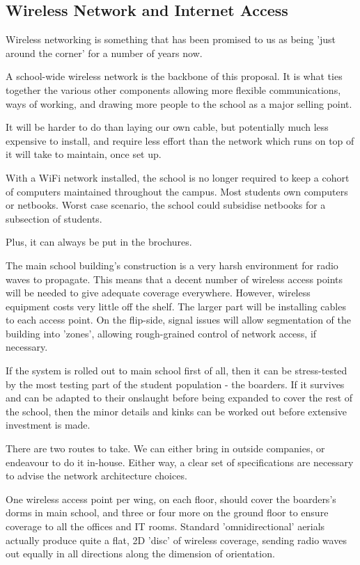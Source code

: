 \documentclass[a4paper,leqno,titlepage]{article}
\begin{document}
\subsection{Wireless Network and Internet Access}


Wireless networking is something that has been promised to us as being 'just
around the corner' for a number of years now.


A school-wide wireless network is the backbone of this proposal. It is
what ties together the various other components allowing more flexible
communications, ways of working, and drawing more people to the school as a
major selling point.


It will be harder to do than laying our own cable, but potentially much less
expensive to install, and require less effort than the network which runs
on top of it will take to maintain, once set up.


With a WiFi network installed, the school is no longer required to keep a cohort
of computers maintained throughout the campus. Most students own computers
or netbooks. Worst case scenario, the school could subsidise netbooks for a
subsection of students.


Plus, it can always be put in the brochures.


The main school building's construction is a very harsh environment for radio
waves to propagate. This means that a decent number of wireless access points
will be needed to give adequate coverage everywhere. However, wireless equipment
costs very little off the shelf. The larger part will be installing cables
to each access point. On the flip-side, signal issues will allow segmentation
of the building into 'zones', allowing rough-grained control of
network access, if necessary.


If the system is rolled out to main school first of all, then it can be
stress-tested by the most testing part of the student population - the boarders.
If it survives and can be adapted to their onslaught before being expanded to
cover the rest of the school, then the minor details and kinks can be worked out
before extensive investment is made.


There are two routes to take. We can either bring in outside companies, or
endeavour to do it in-house. Either way, a clear set of specifications are
necessary to advise the network architecture choices.


One wireless access point per wing, on each floor, should cover the boarders's
dorms in main school, and three or four more on the ground floor to ensure
coverage to all the offices and IT rooms. Standard 'omnidirectional' aerials
actually produce quite a flat, 2D 'disc' of wireless coverage, sending radio
waves out equally in all directions along the dimension of orientation.
\end{document}
